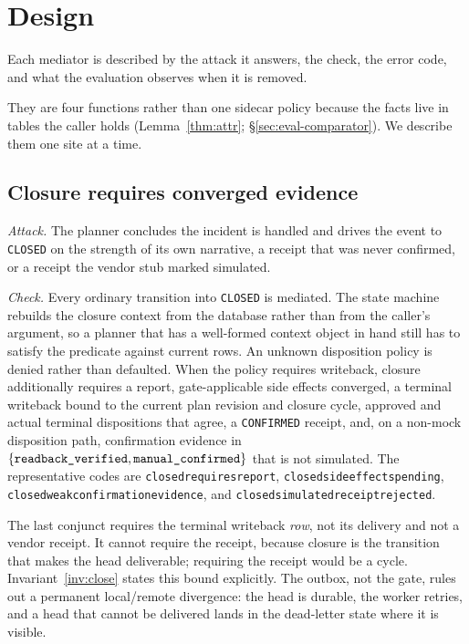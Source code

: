 \documentclass[acmsmall,manuscript,review,anonymous]{acmart}
\renewcommand{\_}{\discretionary{\textunderscore}{}{\textunderscore}}
\begin{document}
\section{Design}
\label{sec:design}

Each mediator is described by the attack it answers, the check, the error
code, and what the evaluation observes when it is removed.

They are four functions rather than one sidecar policy because the facts
live in tables the caller holds (Lemma~\ref{thm:attr};
\S\ref{sec:eval-comparator}). We describe them one site at a time.

\subsection{Closure requires converged evidence}
\label{sec:design-close}

\emph{Attack.} The planner concludes the incident is handled and drives the
event to \texttt{CLOSED} on the strength of its own narrative, a receipt that
was never confirmed, or a receipt the vendor stub marked simulated.

\emph{Check.} Every ordinary transition into \texttt{CLOSED} is mediated. The
state machine rebuilds the closure context from the database rather than from
the caller's argument, so a planner that has a well-formed context object in
hand still has to satisfy the predicate against current rows. An unknown
disposition policy is denied rather than defaulted. When the policy requires
writeback, closure additionally requires a report, gate-applicable side
effects converged, a terminal writeback bound to the current plan revision and
closure cycle, approved and actual terminal dispositions that agree, a
\texttt{CONFIRMED} receipt, and, on a non-mock disposition path, confirmation
evidence in $\{\texttt{readback\_verified}, \texttt{manual\_confirmed}\}$ that
is not simulated. The representative codes are
\texttt{closed\_requires\_report}, \texttt{closed\_side\_effects\_pending},
\texttt{closed\_weak\_confirmation\_evidence}, and
\texttt{closed\_simulated\_receipt\_rejected}.

The last conjunct requires the terminal writeback \emph{row}, not its delivery
and not a vendor receipt. It cannot require the receipt, because closure is the
transition that makes the head deliverable; requiring the receipt would be a
cycle. Invariant~\ref{inv:close} states this bound explicitly. The outbox,
not the gate, rules out a permanent local/remote divergence: the head is
durable, the worker retries, and a head that cannot be delivered lands in the
dead-letter state where it is visible.
\end{document}

